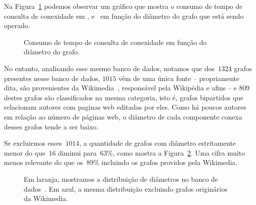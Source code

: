 Na Figura~\ref{fig:sensibilidade-diametro} podemos observar um gráfico que mostra o consumo de tempo de consulta de conexidade em \HK{}, \HDT{} e~\CLHB{} em função do diâmetro do grafo que está sendo operado.

\begin{figure}
\caption{Consumo de tempo de consulta de conexidade em função do diâmetro do grafo.}
\label{fig:sensibilidade-diametro}
\end{figure}

No entanto, analisando esse mesmo banco de dados, notamos que dos~$1324$ grafos presentes nesse banco de dados, $1015$ vêm de uma única fonte -- 
propriamente dita, são provenientes da Wikimedia~\cite{wikimedia}, responsável pela Wikipédia e afins -- 
e $809$ destes grafos são classificados na mesma categoria, isto é, grafos bipartidos que relacionam autores com paginas web editadas por eles. Como há poucos autores em relação ao número de páginas web, o diâmetro de cada componente conexa desses grafos tende a ser baixo.

Se excluirmos esses~$1014$, a quantidade de grafos com diâmetro estritamente menor do que~$16$ diminui para~$63\%$, como mostra a Figura~\ref{fig:distdiametro}.
Uma cifra muito menos relevante do que os~$89\%$ incluindo os grafos providos pela Wikimedia.

\begin{figure}
\begin{center}
\caption{Em laranja, mostramos a distribuição de diâmetros no banco de dados~\cite{KONECT}. Em azul, a mesma distribuição excluindo grafos originários da Wikimedia.}
\label{fig:distdiametro}
\end{center}
\end{figure}

